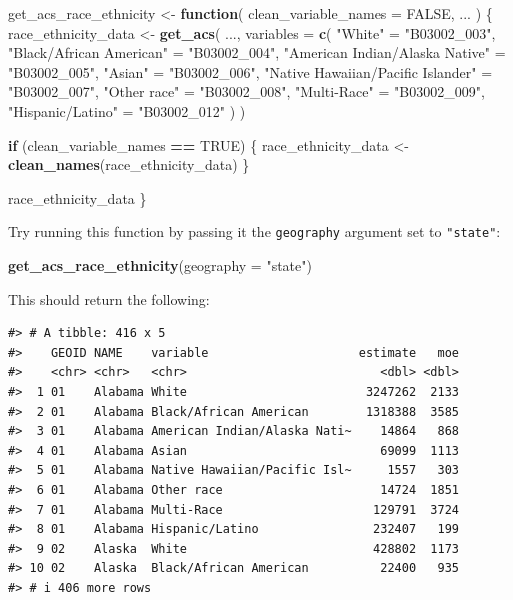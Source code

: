 \documentclass[
]{book}
\newenvironment{Shaded}{\begin{snugshade}}{\end{snugshade}}
\newcommand{\AttributeTok}[1]{\textcolor[rgb]{0.13,0.29,0.53}{#1}}
\newcommand{\ConstantTok}[1]{\textcolor[rgb]{0.56,0.35,0.01}{#1}}
\newcommand{\ControlFlowTok}[1]{\textcolor[rgb]{0.13,0.29,0.53}{\textbf{#1}}}
\newcommand{\FunctionTok}[1]{\textcolor[rgb]{0.13,0.29,0.53}{\textbf{#1}}}
\newcommand{\NormalTok}[1]{#1}
\newcommand{\OtherTok}[1]{\textcolor[rgb]{0.56,0.35,0.01}{#1}}
\newcommand{\SpecialCharTok}[1]{\textcolor[rgb]{0.81,0.36,0.00}{\textbf{#1}}}
\newcommand{\StringTok}[1]{\textcolor[rgb]{0.31,0.60,0.02}{#1}}
\begin{document}
\begin{Shaded}
\begin{Highlighting}[]
\NormalTok{get\_acs\_race\_ethnicity }\OtherTok{\textless{}{-}} \ControlFlowTok{function}\NormalTok{(}
  \AttributeTok{clean\_variable\_names =} \ConstantTok{FALSE}\NormalTok{,}
\NormalTok{  ...}
\NormalTok{) \{}
\NormalTok{  race\_ethnicity\_data }\OtherTok{\textless{}{-}}
    \FunctionTok{get\_acs}\NormalTok{(}
\NormalTok{      ...,}
      \AttributeTok{variables =} \FunctionTok{c}\NormalTok{(}
        \StringTok{"White"} \OtherTok{=} \StringTok{"B03002\_003"}\NormalTok{,}
        \StringTok{"Black/African American"} \OtherTok{=} \StringTok{"B03002\_004"}\NormalTok{,}
        \StringTok{"American Indian/Alaska Native"} \OtherTok{=} \StringTok{"B03002\_005"}\NormalTok{,}
        \StringTok{"Asian"} \OtherTok{=} \StringTok{"B03002\_006"}\NormalTok{,}
        \StringTok{"Native Hawaiian/Pacific Islander"} \OtherTok{=} \StringTok{"B03002\_007"}\NormalTok{,}
        \StringTok{"Other race"} \OtherTok{=} \StringTok{"B03002\_008"}\NormalTok{,}
        \StringTok{"Multi{-}Race"} \OtherTok{=} \StringTok{"B03002\_009"}\NormalTok{,}
        \StringTok{"Hispanic/Latino"} \OtherTok{=} \StringTok{"B03002\_012"}
\NormalTok{      )}
\NormalTok{    )}

  \ControlFlowTok{if}\NormalTok{ (clean\_variable\_names }\SpecialCharTok{==} \ConstantTok{TRUE}\NormalTok{) \{}
\NormalTok{    race\_ethnicity\_data }\OtherTok{\textless{}{-}} \FunctionTok{clean\_names}\NormalTok{(race\_ethnicity\_data)}
\NormalTok{  \}}

\NormalTok{  race\_ethnicity\_data}
\NormalTok{\}}
\end{Highlighting}
\end{Shaded}

Try running this function by passing it the \texttt{geography} argument set to \texttt{"state"}:

\begin{Shaded}
\begin{Highlighting}[]
\FunctionTok{get\_acs\_race\_ethnicity}\NormalTok{(}\AttributeTok{geography =} \StringTok{"state"}\NormalTok{)}
\end{Highlighting}
\end{Shaded}

This should return the following:

\begin{verbatim}
#> # A tibble: 416 x 5
#>    GEOID NAME    variable                     estimate   moe
#>    <chr> <chr>   <chr>                           <dbl> <dbl>
#>  1 01    Alabama White                         3247262  2133
#>  2 01    Alabama Black/African American        1318388  3585
#>  3 01    Alabama American Indian/Alaska Nati~    14864   868
#>  4 01    Alabama Asian                           69099  1113
#>  5 01    Alabama Native Hawaiian/Pacific Isl~     1557   303
#>  6 01    Alabama Other race                      14724  1851
#>  7 01    Alabama Multi-Race                     129791  3724
#>  8 01    Alabama Hispanic/Latino                232407   199
#>  9 02    Alaska  White                          428802  1173
#> 10 02    Alaska  Black/African American          22400   935
#> # i 406 more rows
\end{verbatim}
\end{document}
